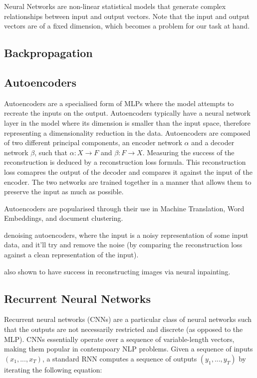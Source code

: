 \documentclass[12pt,twoside]{report}
\begin{document}
Neural Networks are non-linear statistical models that generate complex relationships between input and output vectors. Note that the input and output vectors are of a fixed dimension, which becomes a problem for our task at hand.

\subsection{Backpropagation}

\subsection{Autoencoders}

Autoencoders are a specialised form of MLPs where the model attempts to recreate the inputs on the output. Autoencoders typically have a neural network layer in the model where its dimension is smaller than the input space, therefore representing a dimensionality reduction in the data. Autoencoders are composed of two different principal components, an encoder network $\alpha$ and a decoder network $\beta$, such that $\alpha : X \rightarrow F$ and $\beta : F \rightarrow X$. Measuring the success of the reconstruction is deduced by a reconstruction loss formula. This reconstruction loss comapres the output of the decoder and compares it against the input of the encoder. The two networks are trained together in a manner that allows them to preserve the input as much as possible.


Autoencoders are popularised through their use in Machine Translation, Word Embeddings, and document clustering.


denoising autoencoders, where the input is a noisy representation of some input data, and it'll try and remove the noise (by comparing the reconstruction loss against a clean representation of the input).

also shown to have success in reconstructing images via neural inpainting.

\subsection{Recurrent Neural Networks}

Recurrent neural networks (CNNs) are a particular class of neural networks such that the outputs are not necessarily restricted and discrete (as opposed to the MLP). CNNs essentially operate over a sequence of variable-length vectors, making them popular in contempoary NLP problems. Given a sequence of inputs $(x_1, ..., x_T)$, a standard RNN computes a sequence of outputs $(y_1, ..., y_T)$ by iterating the following equation:
\end{document}
